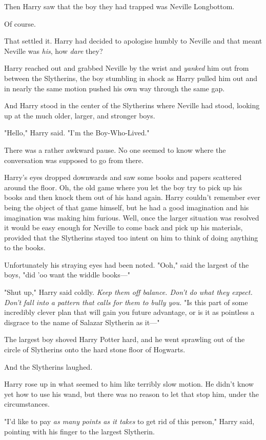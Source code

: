 Then Harry saw that the boy they had trapped was Neville Longbottom.

Of course.

That settled it. Harry had decided to apologise humbly to Neville and that
meant Neville was \emph{his}, how \emph{dare} they?

Harry reached out and grabbed Neville by the wrist and \emph{yanked} him out
from between the Slytherins, the boy stumbling in shock as Harry pulled him out
and in nearly the same motion pushed his own way through the same gap.

And Harry stood in the center of the Slytherins where Neville had stood,
looking up at the much older, larger, and stronger boys.

"Hello," Harry said. "I'm the Boy-Who-Lived."

There was a rather awkward pause. No one seemed to know where the conversation
was supposed to go from there.

Harry's eyes dropped downwards and saw some books and papers scattered around
the floor. Oh, the old game where you let the boy try to pick up his books and
then knock them out of his hand again. Harry couldn't remember ever being the
object of that game himself, but he had a good imagination and his imagination
was making him furious. Well, once the larger situation was resolved it would
be easy enough for Neville to come back and pick up his materials, provided
that the Slytherins stayed too intent on him to think of doing anything to the
books.

Unfortunately his straying eyes had been noted. "Ooh," said the largest of the
boys, "did 'oo want the widdle books---"

"Shut up," Harry said coldly. \emph{Keep them off balance. Don't do what they
expect. Don't fall into a pattern that calls for them to bully you.} "Is this
part of some incredibly clever plan that will gain you future advantage, or is
it as pointless a disgrace to the name of Salazar Slytherin as it---"

The largest boy shoved Harry Potter hard, and he went sprawling out of the
circle of Slytherins onto the hard stone floor of Hogwarts.

And the Slytherins laughed.

Harry rose up in what seemed to him like terribly slow motion. He didn't know
yet how to use his wand, but there was no reason to let that stop him, under
the circumstances.

"I'd like to pay \emph{as many points as it takes} to get rid of this person,"
Harry said, pointing with his finger to the largest Slytherin.

